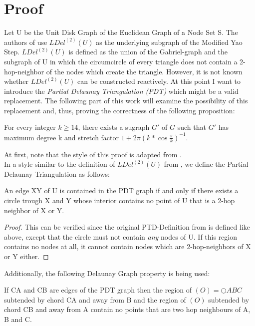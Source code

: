 \section{Proof}
Let U be the Unit Disk Graph of the Euclidean Graph of a Node Set S.
The authors of \cite{kanj} use $LDel^{(2)}(U) $ as the underlying subgraph of the Modified Yao Step.
$LDel^{(2)}(U) $ is defined as the union of the Gabriel-graph and the subgraph of U in which the circumcircle of every triangle does not contain a 2-hop-neighbor of the nodes which create the triangle.
However, it is not known whether $LDel^{(2)}(U) $ can be constructed reactively.
At this point I want to introduce the \emph{Partial Delaunay Triangulation (PDT)} \cite{pdt} which might be a valid replacement.
The following part of this work will examine the possibility of this replacement and, thus, proving the correctness of the following proposition:

\begin{prop}
\label{mastertheorem}
For every integer $k \geq 14 $, there exists a sugraph $G' $ of $G $ such that $G' $ has maximum degree k and stretch factor $1+2\pi (k*\cos{\frac{\pi}{k}})^{-1} $.
\end{prop}

At first, note that the style of this proof is adapted from \cite{kanj}.\\
In a style similar to the definition of $LDel^{(2)}(U) $ from \cite{kanj}, we define the Partial Delaunay Triangulation as follows:
\begin{definition}
\label{emptycircle}
An edge XY of U is contained in the PDT graph if and only if there exists a circle trough X and Y whose interior contains no point of U that is a 2-hop neighbor of X or Y.
\end{definition}
\begin{proof}
This can be verified since the original PTD-Definition from \cite{pdt} is defined like above, except that the circle must not contain \emph{any} nodes of U. 
If this region contains no nodes at all, it cannot contain nodes which are 2-hop-neighbors of X or Y either.  
\end{proof}

Additionally, the following Delaunay Graph property is being used:
\begin{lemma}
\label{emptyregion}
If CA and CB are edges of the PDT graph then the region of $(O)=\bigcirc{ABC} $ subtended by chord  CA and away from B and the region of $(O) $ subtended by chord CB and away from A contain no points that are two hop neighbours of A, B and C.
\end{lemma}



